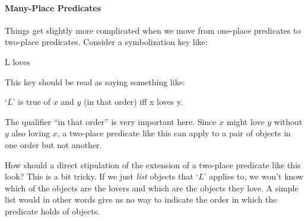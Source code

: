 
\paragraph{Many-Place Predicates} Things get slightly more complicated when we move from one-place predicates to two-place predicates. Consider a symbolization key like:
	\begin{ekey}
		\item[L] \blank loves \blank
	\end{ekey}
This key should be read as saying something like:

	\begin{earg}
		\item[] `$L$' is true of $x$ and $y$ (in that order) iff x loves y.
	\end{earg}
The qualifier ``in that order'' is very important here.  Since $x$ might love $y$ without $y$ also loving $x$, a two-place predicate like this can apply to a pair of objects in one order but not another.

How should a direct stipulation of the extension of a two-place predicate like this look? This is a bit tricky. If we just \emph{list} objects that `$L$' applies to, we won't know which of the objects are the lovers and which are the objects they love.  A simple list would in other words give us no way to indicate the order in which the predicate holds of objects.



